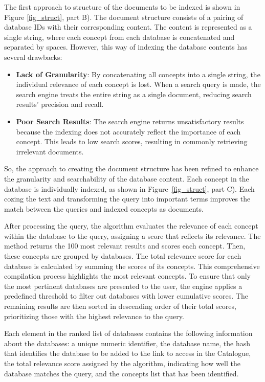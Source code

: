 The first approach to structure of the documents to be indexed is shown in Figure \ref{fig_struct}, part B). The document structure consists of a pairing of database IDs with their corresponding content. The content is represented as a single string, where each concept from each database is concatenated and separated by spaces. However, this way of indexing the database contents has several drawbacks: 

\begin{itemize}
    \item \textbf{Lack of Granularity}: By concatenating all concepts into a single string, the individual relevance of each concept is lost. When a search query is made, the search engine treats the entire string as a single document, reducing search results' precision and recall.
    \item \textbf{Poor Search Results}: The search engine returns unsatisfactory results because the indexing does not accurately reflect the importance of each concept. This leads to low search scores, resulting in commonly retrieving irrelevant documents.
\end{itemize}

So, the approach to creating the document structure has been refined to enhance the granularity and searchability of the database content. Each concept in the database is individually indexed, as shown in Figure~\ref{fig_struct}, part C). Each cozing the text and transforming the query into important terms improves the match between the queries and indexed concepts as documents.

After processing the query, the {\bm} algorithm evaluates the relevance of each concept within the database to the query, assigning a score that reflects its relevance. The method returns the 100 most relevant results and scores each concept. Then, these concepts are grouped by databases. The total relevance score for each database is calculated by summing the scores of its concepts. This comprehensive compilation process highlights the most relevant concepts. To ensure that only the most pertinent databases are presented to the user, the engine applies a predefined threshold to filter out databases with lower cumulative scores. The remaining results are then sorted in descending order of their total scores, prioritizing those with the highest relevance to the query.

Each element in the ranked list of databases contains the following information about the databases: a unique numeric identifier, the database name, the hash that identifies the database to be added to the link to access in the {\ehden} Catalogue, the total relevance score assigned by the {\bm} algorithm, indicating how well the database matches the query, and the concepts list that has been identified.


